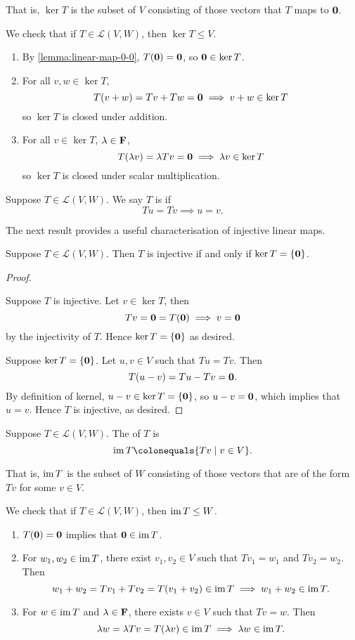 That is, $\ker T$ is the subset of $V$ consisting of those vectors that $T$ maps to $\vb{0}$.


We check that if $T\in\mathcal{L}(V,W)$, then $\ker T\le V$.
\begin{enumerate}[label=(\roman*)]
\item By \ref{lemma:linear-map-0-0}, $T(\vb{0})=\vb{0}$, so $\vb{0}\in\ker T$.
\item For all $v,w\in\ker T$, 
\[T(v+w)=Tv+Tw=\vb{0}\implies v+w\in\ker T\]
so $\ker T$ is closed under addition.
\item For all $v\in\ker T$, $\lambda\in\mathbf F$,
\[T(\lambda v)=\lambda Tv=\vb{0}\implies\lambda v\in\ker T\]
so $\ker T$ is closed under scalar multiplication.
\end{enumerate}

\begin{definition}[Injectivity]
Suppose $T\in\mathcal{L}(V,W)$. We say $T$ is  if
\[Tu=Tv\implies u=v.\]
\end{definition}

The next result provides a useful characterisation of injective linear maps.

\begin{lemma}
Suppose $T\in\mathcal{L}(V,W)$. Then $T$ is injective if and only if $\ker T=\{\vb{0}\}$.
\end{lemma}

\begin{proof} \

\fbox{$\implies$} Suppose $T$ is injective. Let $v\in\ker T$, then
\[Tv=\vb{0}=T(\vb{0})\implies v=\vb{0}\]
by the injectivity of $T$. Hence $\ker T=\{\vb{0}\}$ as desired.

\fbox{$\impliedby$} Suppose $\ker T=\{\vb{0}\}$. Let $u,v\in V$ such that $Tu=Tv$. Then
\[T(u-v)=Tu-Tv=\vb{0}.\]
By definition of kernel, $u-v\in\ker T=\{\vb{0}\}$, so $u-v=\vb{0}$, which implies that $u=v$. Hence $T$ is injective, as desired.
\end{proof}

\begin{definition}[Image]
Suppose $T\in\mathcal{L}(V,W)$. The  of $T$ is
\[\im T\colonequals\{Tv\mid v\in V\}.\]
\end{definition}

That is, $\operatorname{im} T$ is the subset of $W$ consisting of those vectors that are of the form $Tv$ for some $v\in V$.

We check that if $T\in\mathcal{L}(V,W)$, then $\operatorname{im} T\le W$.
\begin{enumerate}[label=(\roman*)]
\item $T(\vb{0})=\vb{0}$ implies that $\vb{0}\in\operatorname{im} T$.
\item For $w_1,w_2\in\operatorname{im} T$, there exist $v_1,v_2\in V$ such that $Tv_1=w_1$ and $Tv_2=w_2$. Then
\[w_1+w_2=Tv_1+Tv_2=T(v_1+v_2)\in\operatorname{im} T\implies w_1+w_2\in\operatorname{im} T.\]
\item For $w\in\operatorname{im} T$ and $\lambda\in\mathbf F$, there exists $v\in V$ such that $Tv=w$. Then
\[\lambda w=\lambda Tv=T(\lambda v)\in\operatorname{im} T\implies\lambda w\in\operatorname{im} T.\]
\end{enumerate}

